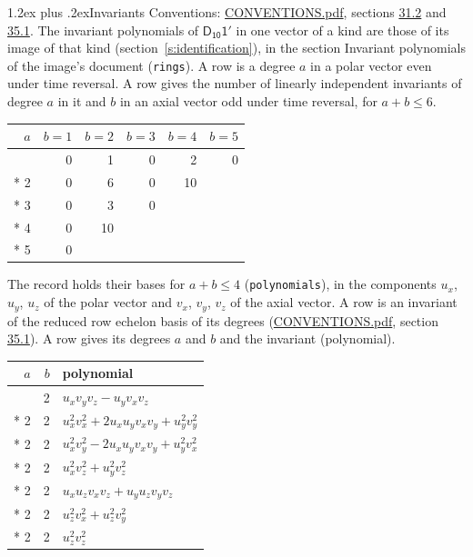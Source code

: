 \documentclass[10pt,a4paper]{article}
\makeatletter
\renewcommand\section{\@startsection{section}{1}{\z@}{-3ex plus -1ex minus -.2ex}%
  {1.2ex plus .2ex}{\normalfont\large\sffamily\bfseries\color{parttitle}}}
\numberwithin{equation}{section}
\newcommand{\grp}[1]{\mathsf{#1}}
\makeatother
\begin{document}
\section{Invariants}\label{s:invariants}
Conventions: \href{../../CONVENTIONS.pdf}{CONVENTIONS.pdf}, sections \href{../../CONVENTIONS.pdf\#conv.31.2}{31.2} and \href{../../CONVENTIONS.pdf\#conv.35.1}{35.1}.
The invariant polynomials of $\grp{D_{10}1'}$ in one vector of a kind are those of its image of that kind (section~\ref{s:identification}), in the section Invariant polynomials of the image's document (\texttt{rings}).
\leavevmode\label{n:index.degree.polar}\label{n:index.degree.axial}A row is a degree $a$ in a polar vector even under time reversal. A row gives the number of linearly independent invariants of degree $a$ in it and $b$ in an axial vector odd under time reversal, for $a + b \le 6$.
{\small\begin{longtable}{@{}rrrrrr@{}}\toprule
$a$ & $b = 1$ & $b = 2$ & $b = 3$ & $b = 4$ & $b = 5$\\\midrule\endhead
\bottomrule\endfoot\endlastfoot
1 & 0 & 1 & 0 & 2 & 0\\*
2 & 0 & 6 & 0 & 10 & \\*
3 & 0 & 3 & 0 &  & \\*
4 & 0 & 10 &  &  & \\*
5 & 0 &  &  &  & \\
\bottomrule\end{longtable}}
\leavevmode\label{n:local.component.polar}\label{n:local.component.axial}The record holds their bases for $a + b \le 4$ (\texttt{polynomials}), in the components $u_{x}$, $u_{y}$, $u_{z}$ of the polar vector and $v_{x}$, $v_{y}$, $v_{z}$ of the axial vector. \label{n:head.polynomial}A row is an invariant of the reduced row echelon basis of its degrees (\href{../../CONVENTIONS.pdf}{CONVENTIONS.pdf}, section \href{../../CONVENTIONS.pdf\#conv.35.1}{35.1}). A row gives its degrees $a$ and $b$ and the invariant (polynomial).
{\small\renewcommand{\arraystretch}{1.2}\begin{longtable}{@{}rrl@{}}\toprule
$a$ & $b$ & polynomial\\\midrule\endhead
\bottomrule\endfoot\endlastfoot
1 & 2 & $u_{x}v_{y}v_{z} - u_{y}v_{x}v_{z}$\\*
2 & 2 & $u_{x}^{2}v_{x}^{2} + 2u_{x}u_{y}v_{x}v_{y} + u_{y}^{2}v_{y}^{2}$\\*
2 & 2 & $u_{x}^{2}v_{y}^{2} - 2u_{x}u_{y}v_{x}v_{y} + u_{y}^{2}v_{x}^{2}$\\*
2 & 2 & $u_{x}^{2}v_{z}^{2} + u_{y}^{2}v_{z}^{2}$\\*
2 & 2 & $u_{x}u_{z}v_{x}v_{z} + u_{y}u_{z}v_{y}v_{z}$\\*
2 & 2 & $u_{z}^{2}v_{x}^{2} + u_{z}^{2}v_{y}^{2}$\\*
2 & 2 & $u_{z}^{2}v_{z}^{2}$\\
\bottomrule\end{longtable}}
\end{document}
